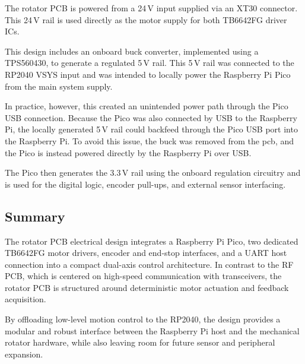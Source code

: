 The rotator PCB is powered from a 24\,V input supplied via an XT30 connector. This 24\,V rail is used directly as the motor supply for both TB6642FG driver ICs.

This design includes an onboard buck converter, implemented using a TPS560430, to generate a regulated 5\,V rail. This 5\,V rail was connected to the RP2040 VSYS input and was intended to locally power the Raspberry Pi Pico from the main system supply.

In practice, however, this created an unintended power path through the Pico USB connection. Because the Pico was also connected by USB to the Raspberry Pi, the locally generated 5\,V rail could backfeed through the Pico USB port into the Raspberry Pi. To avoid this issue, the buck was removed from the pcb, and the Pico is instead powered directly by the Raspberry Pi over USB.

The Pico then generates the 3.3\,V rail using the onboard regulation circuitry and is used for the digital logic, encoder pull-ups, and external sensor interfacing.

\subsection{Summary}
\label{subsec:rotator_summary}

The rotator PCB electrical design integrates a Raspberry Pi Pico, two dedicated TB6642FG motor drivers, encoder and end-stop interfaces, and a UART host connection into a compact dual-axis control architecture. In contrast to the RF PCB, which is centered on high-speed communication with transceivers, the rotator PCB is structured around deterministic motor actuation and feedback acquisition.

By offloading low-level motion control to the RP2040, the design provides a modular and robust interface between the Raspberry Pi host and the mechanical rotator hardware, while also leaving room for future sensor and peripheral expansion.